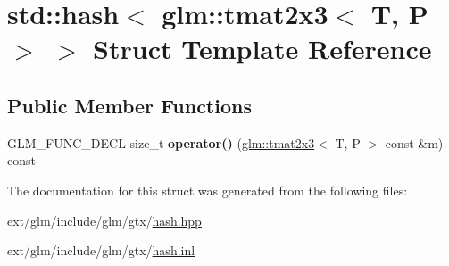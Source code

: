 \hypertarget{structstd_1_1hash_3_01glm_1_1tmat2x3_3_01_t_00_01_p_01_4_01_4}{\section{std\-:\-:hash$<$ glm\-:\-:tmat2x3$<$ T, P $>$ $>$ Struct Template Reference}
\label{structstd_1_1hash_3_01glm_1_1tmat2x3_3_01_t_00_01_p_01_4_01_4}
}
\subsection*{Public Member Functions}
\begin{DoxyCompactItemize}
\item 
\hypertarget{structstd_1_1hash_3_01glm_1_1tmat2x3_3_01_t_00_01_p_01_4_01_4_a1fd0eb8bd56ec3d9eb284552c447125a}{G\-L\-M\-\_\-\-F\-U\-N\-C\-\_\-\-D\-E\-C\-L size\-\_\-t {\bfseries operator()} (\hyperlink{structglm_1_1tmat2x3}{glm\-::tmat2x3}$<$ T, P $>$ const \&m) const }\label{structstd_1_1hash_3_01glm_1_1tmat2x3_3_01_t_00_01_p_01_4_01_4_a1fd0eb8bd56ec3d9eb284552c447125a}

\end{DoxyCompactItemize}


The documentation for this struct was generated from the following files\-:\begin{DoxyCompactItemize}
\item 
ext/glm/include/glm/gtx/\hyperlink{hash_8hpp}{hash.\-hpp}\item 
ext/glm/include/glm/gtx/\hyperlink{hash_8inl}{hash.\-inl}\end{DoxyCompactItemize}
